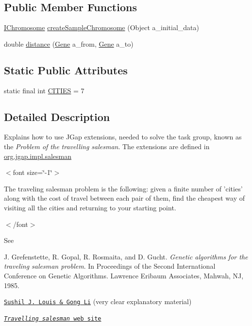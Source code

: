 \subsection*{Public Member Functions}
\begin{DoxyCompactItemize}
\item 
\hyperlink{interfaceorg_1_1jgap_1_1_i_chromosome}{I\-Chromosome} \hyperlink{classorg_1_1jgap_1_1impl_1_1salesman_1_1_travelling_salesman_test_1_1_travelling_salesman_for_testing_a3587ad164718c422dba17cc9c1a2507f}{create\-Sample\-Chromosome} (Object a\-\_\-initial\-\_\-data)
\item 
double \hyperlink{classorg_1_1jgap_1_1impl_1_1salesman_1_1_travelling_salesman_test_1_1_travelling_salesman_for_testing_ad85b8e3b7f696be1895a8f4942786a2d}{distance} (\hyperlink{interfaceorg_1_1jgap_1_1_gene}{Gene} a\-\_\-from, \hyperlink{interfaceorg_1_1jgap_1_1_gene}{Gene} a\-\_\-to)
\end{DoxyCompactItemize}
\subsection*{Static Public Attributes}
\begin{DoxyCompactItemize}
\item 
static final int \hyperlink{classorg_1_1jgap_1_1impl_1_1salesman_1_1_travelling_salesman_test_1_1_travelling_salesman_for_testing_af3a7d892c006e39524622ed2ee779c16}{C\-I\-T\-I\-E\-S} = 7
\end{DoxyCompactItemize}


\subsection{Detailed Description}
Explains how to use J\-Gap extensions, needed to solve the task group, known as the {\itshape Problem of the travelling salesman}. The extensions are defined in \hyperlink{namespaceorg_1_1jgap_1_1impl_1_1salesman}{org.\-jgap.\-impl.\-salesman}

$<$font size=\char`\"{}-\/1\char`\"{}$>$

The traveling salesman problem is the following\-: given a finite number of 'cities' along with the cost of travel between each pair of them, find the cheapest way of visiting all the cities and returning to your starting point. 

$<$/font$>$

See 
\begin{DoxyItemize}
\item J. Grefenstette, R. Gopal, R. Rosmaita, and D. Gucht. {\itshape Genetic algorithms for the traveling salesman problem}. In Proceedings of the Second International Conference on Genetic Algorithms. Lawrence Eribaum Associates, Mahwah, N\-J, 1985.  
\item \href{http://ecsl.cs.unr.edu/docs/techreports/gong/node3.html}{\tt Sushil J. Louis \& Gong Li} (very clear explanatory material)  
\item \href{http://www.tsp.gatech.edu www.tsp.gatech.edu}{\tt {\itshape Travelling salesman} web site}  
\end{DoxyItemize}

